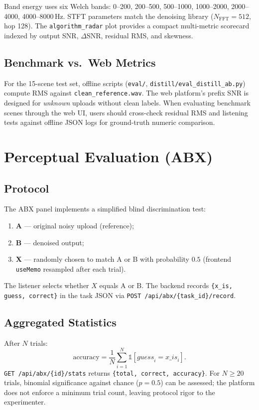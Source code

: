 Band energy uses six Welch bands: 0--200, 200--500, 500--1000, 1000--2000, 2000--4000, 4000--8000\,Hz. STFT parameters match the denoising library ($N_{\mathrm{FFT}}=512$, hop 128). The \texttt{algorithm\_radar} plot provides a compact multi-metric scorecard indexed by output SNR, $\Delta$SNR, residual RMS, and skewness.

\subsection{Benchmark vs.\ Web Metrics}

For the 15-scene test set, offline scripts (\texttt{eval/}, \texttt{distill/eval\_distill\_ab.py}) compute RMS against \texttt{clean\_reference.wav}. The web platform's prefix SNR is designed for \emph{unknown} uploads without clean labels. When evaluating benchmark scenes through the web UI, users should cross-check residual RMS and listening tests against offline JSON logs for ground-truth numeric comparison.

\section{Perceptual Evaluation (ABX)}
\label{sec:abx}

\subsection{Protocol}

The ABX panel implements a simplified blind discrimination test:
\begin{enumerate}
  \item \textbf{A} --- original noisy upload (reference);
  \item \textbf{B} --- denoised output;
  \item \textbf{X} --- randomly chosen to match A or B with probability $0.5$ (frontend \texttt{useMemo} resampled after each trial).
\end{enumerate}
The listener selects whether $X$ equals A or B. The backend records \texttt{\{x\_is, guess, correct\}} in the task JSON via \texttt{POST /api/abx/\{task\_id\}/record}.

\subsection{Aggregated Statistics}

After $N$ trials:
\begin{equation}
  \mathrm{accuracy} = \frac{1}{N}\sum_{i=1}^{N} \mathbb{1}[\mathit{guess}_i = \mathit{x\_is}_i].
\end{equation}
\texttt{GET /api/abx/\{id\}/stats} returns \texttt{\{total, correct, accuracy\}}. For $N\ge 20$ trials, binomial significance against chance ($p=0.5$) can be assessed; the platform does not enforce a minimum trial count, leaving protocol rigor to the experimenter.

